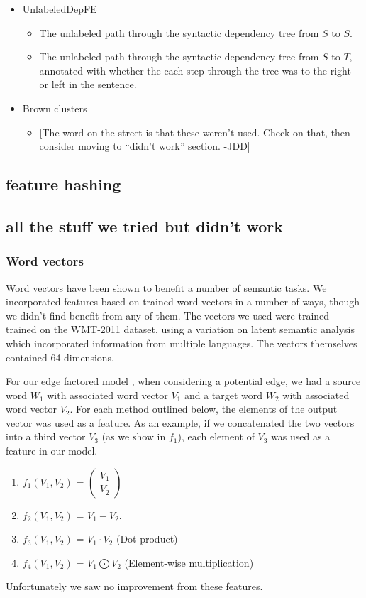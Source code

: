 \documentclass[11pt]{article}
\newcommand{\jdcomment}[1]{\textcolor{NavyBlue}{[#1 -JDD]}}
\begin{document}
\begin{itemize}
\begin{itemize}
\end{itemize}
\item UnlabeledDepFE
\begin{itemize}
\item The unlabeled path through the syntactic dependency tree from $S$ to $S$. 
\item The unlabeled path through the syntactic dependency tree from $S$ to $T$, annotated with whether the each step through the tree was to the right or left in the sentence.
\end{itemize}
\item Brown clusters
\begin{itemize}
\item \jdcomment{The word on the street is that these weren't used. Check on that, then consider moving to ``didn't work'' section.}
\end{itemize}
\end{itemize}
\subsection{feature hashing}



\subsection{all the stuff we tried but didn't work}
\subsubsection{Word vectors}
Word vectors have been shown to benefit a number of semantic tasks. We incorporated features based on trained word vectors in a number of ways, though we didn't find benefit from any of them. The vectors we used \cite{wordVectors} were trained trained on the WMT-2011 dataset, using a variation on latent semantic analysis which incorporated information from multiple languages. The vectors themselves contained 64 dimensions. 

 For our edge factored model \logitedge, when considering a potential edge, we had a source word $W_1$ with associated word vector $V_1$ and a target word $W_2$ with associated word vector $V_2$. For each method outlined below, the elements of the output vector was used as a feature. As an example, if we concatenated the two vectors into a third vector $V_3$ (as we show in $f_1$), each element of $V_3$ was used as a feature in our model. 
\begin{enumerate}
\item $f_1(V_1,V_2)$ = $ \left( \begin{smallmatrix} V_1\\ V_2 \end{smallmatrix} \right)$
\item $f_2(V_1,V_2)$ = $V_1 - V_2$.
\item $f_3(V_1,V_2)$ = $V_1 \cdot V_2$ (Dot product)
\item $f_4(V_1,V_2)$ = $V_1 \bigodot V_2$ (Element-wise multiplication)
\end{enumerate}
Unfortunately we saw no improvement from these features.
\end{document}
